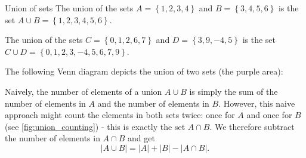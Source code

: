 \begin{example}{Union of sets}{}
	The union of the sets $A=\left\{ 1,2,3,4 \right\}$ and $B=\left\{ 3,4,5,6 \right\}$ is the set $A\cup B=\left\{ 1,2,3,4,5,6 \right\}$.

	The union of the sets $C=\left\{ 0,1,2,6,7 \right\}$ and $D=\left\{ 3,9,-4,5 \right\}$ is the set $C\cup D=\left\{ 0,1,2,3,-4,5,6,7,9 \right\}$.
\end{example}

The following Venn diagram depicts the union of two sets (the purple area):
\begin{figure}[H]
	\centering
\end{figure}

Naively, the number of elements of a union $A\cup B$ is simply the sum of the number of elements in $A$ and the number of elements in $B$. However, this naive approach might count the elements in both sets twice: once for $A$ and once for $B$ (see \autoref{fig:union_counting}) - this is exactly the set $A\cap B$. We therefore subtract the number of elements in $A\cap B$ and get
\begin{equation}
	|A\cup B| = |A|+|B|-|A\cap B|.
	\label{eq:number_of_elements_in_union}
\end{equation}

